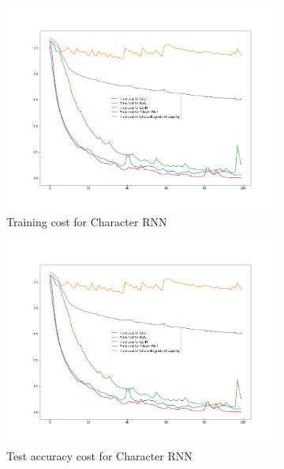 \begin{figure}[H]
    \begin{subfigure}{0.5\textwidth}
        \centering
        \includegraphics[width=1\linewidth]{assets/plots2/q6_1.png}
        \caption{Training cost for Character RNN}
    \end{subfigure}
    \begin{subfigure}{0.5\textwidth}
        \centering
        \includegraphics[width=1\linewidth]{assets/plots2/q6_3.png}
        \caption{Test accuracy cost for Character RNN}
    \end{subfigure}
    \begin{subfigure}{0.5\textwidth}
        \centering

\end{subfigure}
\end{figure}
